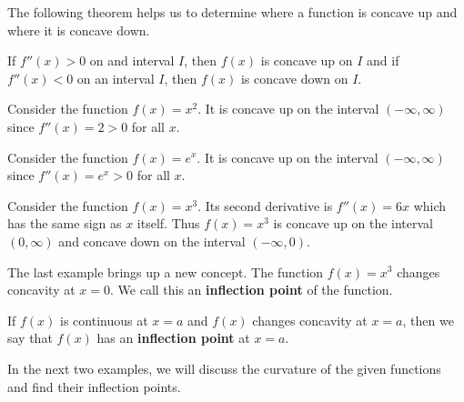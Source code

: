 \documentclass{ximera}
\begin{document}

The following theorem helps us to determine where a function is concave up and where it is concave down.\\

\begin{theorem}[Concavity]
If $f''(x) > 0$ on and interval $I$, then $f(x)$ is concave up on $I$ and
if $f''(x) < 0$ on an interval $I$, then $f(x)$ is concave down on $I$.
\end{theorem}



\begin{example}[example 1]
Consider the function $f(x) = x^2$.  It is concave up on the interval $(-\infty, \infty)$ since $f''(x) = 2 > 0$
for all $x$.
\end{example}

\begin{example}[example 2]
Consider the function $f(x) = e^x$.  It is concave up on the interval $(-\infty, \infty)$ since $f''(x) = e^x > 0$
for all $x$.
\end{example}


\begin{example}[example 3]
Consider the function $f(x) = x^3$.  Its second derivative is $f''(x) = 6x$ 
which has the same sign as $x$ itself. Thus $f(x) = x^3$ is concave up on the interval $(0, \infty)$
and concave down on the interval $(-\infty, 0)$.
\end{example}



The last example brings up a new concept.  The function $f(x) = x^3$ changes concavity at $x = 0$.  
We call this an {\bf inflection point} of the function.\\

\begin{definition}
If $f(x)$ is continuous at $x=a$ and $f(x)$ changes concavity at $x = a$, then
we say that $f(x)$ has an \textbf{inflection point} at $x = a$.
\end{definition} 

In the next two examples, we will discuss the curvature of the given functions and find their inflection points.


\begin{image}
\end{image}
\end{document}
